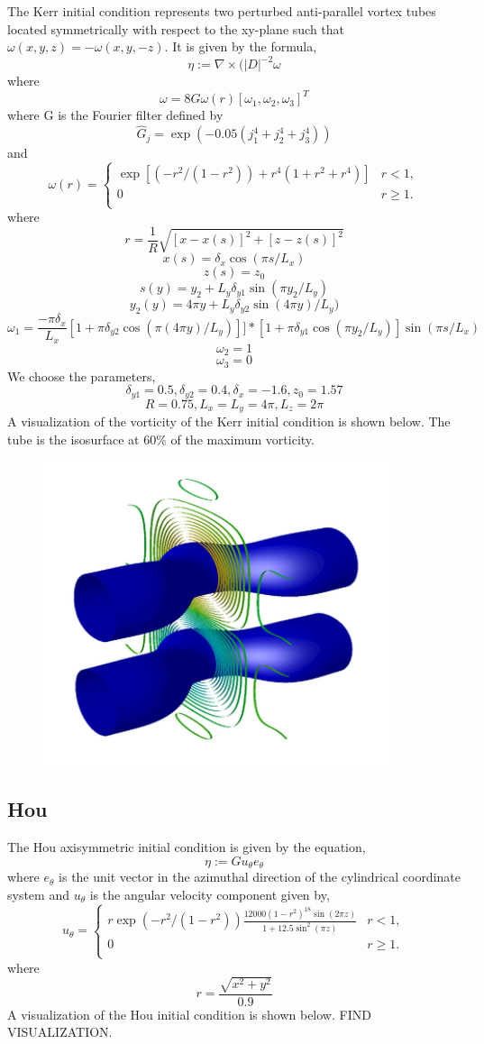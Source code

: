 \documentclass[12pt]{article}
\begin{document}
\begin{flushleft}
The Kerr initial condition represents two perturbed anti-parallel vortex tubes located symmetrically with respect to the xy-plane such that $\omega(x,y,z)=-\omega(x,y,-z)$. It is given by the formula,
$$\eta := \nabla \times (|D|^{-2}\omega$$
where
$$\omega = 8G\omega(r)[\omega_1,\omega_2,\omega_3]^T$$
where G is the Fourier filter defined by 
$$\hat{G}_j = \exp(-0.05(j_1^4 + j_2^4 + j_3^4))$$
and
\[ \omega(r) = \begin{cases} 
      \exp[(-r^2/(1-r^2))+r^4(1+r^2+r^4)] & r<1, \\
      0 & r\geq 1. \\ 
   \end{cases}
\]
where
$$r = \frac{1}{R}\sqrt{[x-x(s)]^2 + [z-z(s)]^2}$$
$$x(s) = \delta_x\cos(\pi s/L_x)$$
$$z(s) = z_0$$
$$s(y) = y_2 + L_y\delta_{y1}\sin(\pi y_2/L_y)$$
$$y_2(y) = 4\pi y+L_y\delta_{y2}\sin(4\pi y)/L_y)$$
$$\omega_1 = \frac{-\pi\delta_x}{L_x}[1+\pi\delta_{y2}\cos(\pi(4\pi y)/L_y)]]*[1+\pi\delta_{y1}\cos(\pi y_2/L_y)]\sin(\pi s/L_x)$$
$$\omega_2 = 1$$
$$\omega_3 = 0$$
We choose the parameters,
$$\delta_{y1} = 0.5, \delta_{y2}=0.4, \delta_x=-1.6, z_0=1.57$$
$$R=0.75, L_x = L_y = 4\pi, L_z = 2\pi$$
A visualization of the vorticity of the Kerr initial condition is shown below. The tube is the isosurface at 60\% of the maximum vorticity. 
\begin{figure}[h!]
\centering
\includegraphics[scale=1.0]{Kerr_Vortex.png}
\end{figure}
\subsection{Hou}

The Hou axisymmetric initial condition is given by the equation,
$$\eta := Gu_\theta e_\theta$$
where $e_\theta$ is the unit vector in the azimuthal direction of the cylindrical coordinate system and $u_\theta$ is the angular velocity component given by,
\[ u_\theta = \begin{cases} 
      r\exp(-r^2/(1-r^2))\frac{12000(1-r^2)^{18}\sin(2\pi z)}{1+12.5\sin^2(\pi z)}& r<1, \\
      0 & r\geq 1. \\ 
   \end{cases}
\]
where 
$$r = \frac{\sqrt{x^2+y^2}}{0.9}$$
A visualization of the Hou initial condition is shown below. FIND VISUALIZATION.


\end{flushleft}
\end{document}
